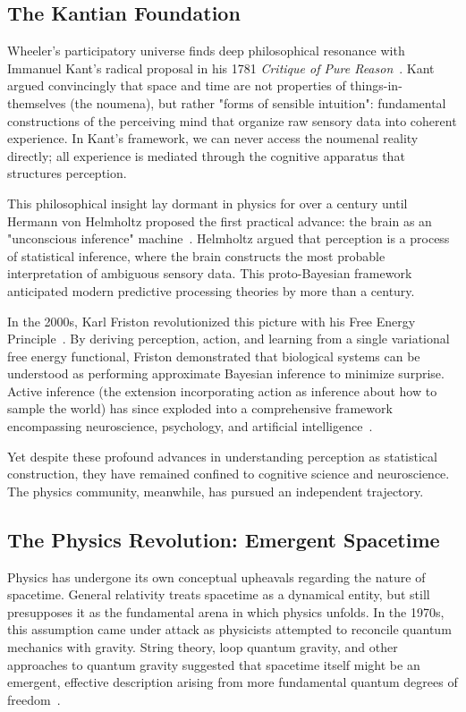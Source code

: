 \documentclass[11pt]{article}
\begin{document}
\subsection{The Kantian Foundation}

Wheeler's participatory universe finds deep philosophical resonance with Immanuel Kant's radical proposal in his 1781 \emph{Critique of Pure Reason}~\cite{Kant1781}. Kant argued convincingly that space and time are not properties of things-in-themselves (the noumena), but rather "forms of sensible intuition": fundamental constructions of the perceiving mind that organize raw sensory data into coherent experience. In Kant's framework, we can never access the noumenal reality directly; all experience is mediated through the cognitive apparatus that structures perception.

This philosophical insight lay dormant in physics for over a century until Hermann von Helmholtz proposed the first practical advance: the brain as an "unconscious inference" machine~\cite{Helmholtz1867}. Helmholtz argued that perception is a process of statistical inference, where the brain constructs the most probable interpretation of ambiguous sensory data. This proto-Bayesian framework anticipated modern predictive processing theories by more than a century.

In the 2000s, Karl Friston revolutionized this picture with his Free Energy Principle~\cite{Friston2010}. By deriving perception, action, and learning from a single variational free energy functional, Friston demonstrated that biological systems can be understood as performing approximate Bayesian inference to minimize surprise. Active inference (the extension incorporating action as inference about how to sample the world) has since exploded into a comprehensive framework encompassing neuroscience, psychology, and artificial intelligence~\cite{parr2022active}.

Yet despite these profound advances in understanding perception as statistical construction, they have remained confined to cognitive science and neuroscience. The physics community, meanwhile, has pursued an independent trajectory.

\subsection{The Physics Revolution: Emergent Spacetime}

Physics has undergone its own conceptual upheavals regarding the nature of spacetime. General relativity treats spacetime as a dynamical entity, but still presupposes it as the fundamental arena in which physics unfolds. In the 1970s, this assumption came under attack as physicists attempted to reconcile quantum mechanics with gravity. String theory, loop quantum gravity, and other approaches to quantum gravity suggested that spacetime itself might be an emergent, effective description arising from more fundamental quantum degrees of freedom~\cite{Carlip2014}.
\end{document}
